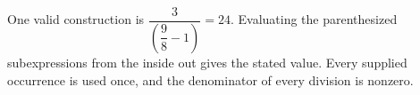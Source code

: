 One valid construction is $\boxed{\dfrac{3}{(\dfrac{9}{8}-1)}=24}$. Evaluating the parenthesized subexpressions from the inside out gives the stated value. Every supplied occurrence is used once, and the denominator of every division is nonzero.
